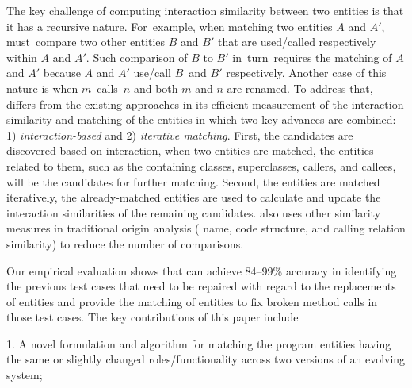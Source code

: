 The key challenge of computing interaction similarity between two
entities is that it has a recursive nature. For~example, when
matching two entities $A$ and $A'$, {\tool} must~compare two other
entities $B$ and $B'$ that are used/called respectively within $A$
and $A'$. Such comparison of $B$ to $B'$ in~turn~requires the matching
of $A$ and $A'$ because $A$ and $A'$ use/call $B$~and $B'$
respectively. Another case of this nature is when $m$~calls~$n$ and
both $m$ and $n$ are renamed.
To address that, {\tool} differs from the existing approaches in its
efficient measurement of the interaction similarity and matching of
the entities in which two key advances are combined: 1) {\em
  interaction-based} and 2) {\em iterative matching}. First, the
candidates are discovered based on interaction, \ie when two entities
are matched, the entities related to them, such as the containing
classes, superclasses, callers, and callees, will be the candidates
for further matching. Second, the entities are matched iteratively,
\ie the already-matched entities are used to calculate and update the
interaction similarities of the remaining candidates. {\tool} also
uses other similarity measures in traditional origin analysis (\eg
name, code structure, and calling relation similarity) to reduce the
number of comparisons.

Our empirical evaluation shows that {\tool} can achieve 84--99\%
accuracy in identifying the previous test cases that need to be
repaired with regard to the replacements of entities and provide the
matching of entities to fix broken method calls in those test
cases. The key contributions of this paper include

1. A novel formulation and algorithm for matching the program entities
having the same or slightly changed roles/functionality across two
versions of an evolving system;


